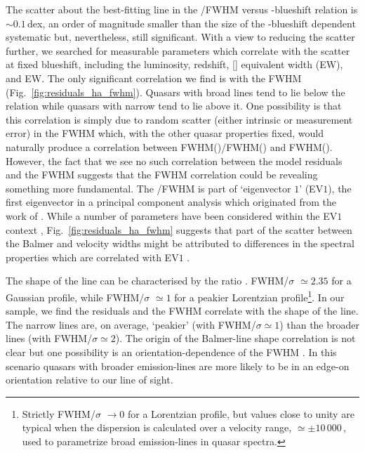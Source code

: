 The scatter about the best-fitting line in the /\ha FWHM versus -blueshift relation is $\sim0.1$\,dex, an order of magnitude smaller than the size of the -blueshift dependent systematic but, nevertheless, still significant.
With a view to reducing the scatter further, we searched for measurable parameters which correlate with the scatter at fixed  blueshift, including the luminosity, redshift, [] equivalent width (EW), and  EW.
The only significant correlation we find is with the \ha FWHM (Fig.~\ref{fig:residuals_ha_fwhm}).
Quasars with broad \ha lines tend to lie below the relation while quasars with narrow \ha tend to lie above it.
One possibility is that this correlation is simply due to random scatter (either intrinsic or measurement error) in the \ha FWHM which, with the other quasar properties fixed, would naturally produce a correlation between FWHM()/FWHM(\hans) and FWHM(\hans).
However, the fact that we see no such correlation between the model residuals and the  FWHM suggests that the \ha FWHM correlation could be revealing something more fundamental. 
The \hans/\hb FWHM is part of `eigenvector $1$' (EV$1$), the first eigenvector in a principal component analysis which originated from the work of \citet{boroson92}.    
While a number of parameters have been considered within the EV$1$ context \citep[e.g.][]{brotherton99},
Fig.~\ref{fig:residuals_ha_fwhm} suggests that part of the scatter between the Balmer and  velocity widths might be attributed to differences in the spectral properties which are correlated with EV$1$ \citep{marziani13}. 

The shape of the line can be characterised by the ratio \citep[FWHM/$\sigma$, where $\sigma$ is the dispersion, derived from the second moment velocity; e.g.][]{kollatschny11,Kollatschny13}. 
FWHM/$\sigma$ $\simeq 2.35$ for a Gaussian profile, while FWHM/$\sigma$ $\simeq 1$ for a peakier Lorentzian profile\footnote{Strictly FWHM/$\sigma$ $\rightarrow 0$ for a Lorentzian profile, but values close to unity are typical when the dispersion is calculated over a velocity range, $\simeq\pm10\,000$\,\kms, used to parametrize broad emission-lines in quasar spectra.}.
In our sample, we find the residuals and the \ha FWHM correlate with the shape of the line.   
The narrow lines are, on average, `peakier' (with FWHM/$\sigma\simeq1$) than the broader lines (with FWHM/$\sigma\simeq2$).   
The origin of the Balmer-line shape correlation is not clear but one possibility is an orientation-dependence of the \ha FWHM \citep[e.g.][]{shen14}. 
In this scenario quasars with broader emission-lines are more likely to be in an edge-on orientation relative to our line of sight.  
    

